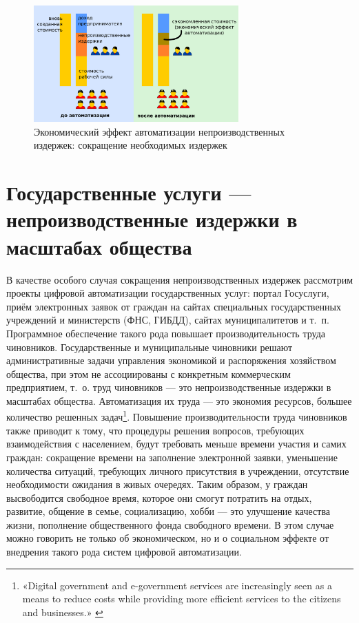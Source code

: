 \documentclass{article}
\begin{document}
\begin{figure}[h]
    \centering
    \includegraphics[width=0.70\textwidth]{effect-nonproduction}
    \caption{Экономический эффект автоматизации непроизводственных издержек: сокращение необходимых издержек}
    \label{fig:effect_nonproduction}
\end{figure}

\section*{Государственные услуги — непроизводственные издержки в масштабах общества}

В качестве особого случая сокращения непроизводственных издержек рассмотрим проекты цифровой автоматизации государственных услуг: портал Госуслуги, приём электронных заявок от граждан на сайтах специальных государственных учреждений и министерств (ФНС, ГИБДД), сайтах муниципалитетов и т.~п. Программное обеспечение такого рода повышает производительность труда чиновников. Государственные и муниципальные чиновники решают административные задачи управления экономикой и распоряжения хозяйством общества, при этом не ассоциированы с конкретным коммерческим предприятием, т.~о. труд чиновников — это непроизводственные издержки в масштабах общества. Автоматизация их труда — это экономия ресурсов, большее количество решенных задач\footnote{«Digital government and e-government services are increasingly seen as a means to reduce costs while providing more efficient services to the citizens and businesses.» \cite{economicDigitalization2019}}. Повышение производительности труда чиновников также приводит к тому, что процедуры решения вопросов, требующих взаимодействия с населением, будут требовать меньше времени участия и самих граждан: сокращение времени на заполнение электронной заявки, уменьшение количества ситуаций, требующих личного присутствия в учреждении, отсутствие необходимости ожидания в живых очередях. Таким образом, у граждан высвободится свободное время, которое они смогут потратить на отдых, развитие, общение в семье, социализацию, хобби — это улучшение качества жизни, пополнение общественного фонда свободного времени. В этом случае можно говорить не только об экономическом, но и о социальном эффекте от внедрения такого рода систем цифровой автоматизации.
\end{document}
